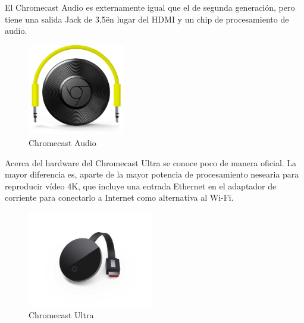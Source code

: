 El Chromecast Audio es externamente igual que el de segunda generación, pero tiene una salida Jack de 3,5\" en lugar del HDMI y un chip de procesamiento de audio.

\begin{figure}[h]
	\centering
	\includegraphics[width=0.38\textwidth]{./Imagenes/chromecastaudio.png}
	\caption{Chromecast Audio}\label{fig:audio}
\end{figure}

Acerca del hardware del Chromecast Ultra se conoce poco de manera oficial.
La mayor diferencia es, aparte de la mayor potencia de procesamiento nesearia para reproducir vídeo 4K, que incluye una entrada Ethernet en el adaptador de corriente para conectarlo a Internet como alternativa al Wi-Fi.

\begin{figure}[h]
	\centering
	\includegraphics[width=0.49\textwidth]{./Imagenes/chromecast-ultra.jpg}
	\caption{Chromecast Ultra}\label{fig:ultra}
\end{figure}

